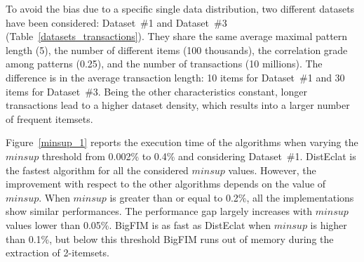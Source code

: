 To avoid the bias due to a specific single data distribution,
two different datasets have been considered:
Dataset~\#1 and Dataset~\#3 (Table~\ref{datasets_transactions}).
They share the same average maximal pattern length (5),
the number of different items (100 thousands),
the correlation grade among patterns (0.25), and
the number of transactions (10 millions).
The difference is in the average transaction length:
10 items for Dataset~\#1 and 30 items for Dataset~\#3.
Being the other characteristics constant,
longer transactions lead to a higher dataset density,
which results into a larger number of frequent itemsets.


Figure~\ref{minsup_1} reports the execution time of the algorithms when varying 
the $minsup$ threshold from 0.002\% to 0.4\% and
considering Dataset~\#1. DistEclat is the fastest algorithm for all the
considered $minsup$ values. However, the improvement with respect to the
other algorithms depends on the value of $minsup$.
When $minsup$ is greater than or equal to 0.2\%, all the implementations show
similar performances.
The performance gap largely increases with $minsup$ values lower than 0.05\%.
BigFIM is as fast as DistEclat when $minsup$ is higher than 0.1\%, but below
this threshold BigFIM runs out of memory during the extraction of 2-itemsets.


